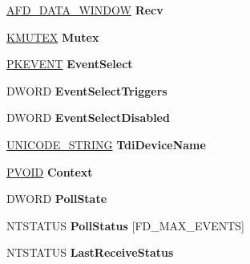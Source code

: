 \begin{DoxyCompactItemize}
\item 
\mbox{\label{struct___a_f_d___f_c_b_ad835dd04de86a1135b0fc7a15b063022}} 
\hyperlink{struct___a_f_d___d_a_t_a___w_i_n_d_o_w}{A\+F\+D\+\_\+\+D\+A\+T\+A\+\_\+\+W\+I\+N\+D\+OW} {\bfseries Recv}
\item 
\mbox{\label{struct___a_f_d___f_c_b_af5a5016765e974260d9beff1cfbc437a}} 
\hyperlink{struct___k_m_u_t_a_n_t}{K\+M\+U\+T\+EX} {\bfseries Mutex}
\item 
\mbox{\label{struct___a_f_d___f_c_b_ae275979ceecf39ce45f8b279416dd208}} 
\hyperlink{struct___k_e_v_e_n_t}{P\+K\+E\+V\+E\+NT} {\bfseries Event\+Select}
\item 
\mbox{\label{struct___a_f_d___f_c_b_abc8585d94e8db43f3c6a02a421456524}} 
D\+W\+O\+RD {\bfseries Event\+Select\+Triggers}
\item 
\mbox{\label{struct___a_f_d___f_c_b_a032dab0d1413ed52a9809342de9b6323}} 
D\+W\+O\+RD {\bfseries Event\+Select\+Disabled}
\item 
\mbox{\label{struct___a_f_d___f_c_b_a7931a3d84299331640ec8f60e9350047}} 
\hyperlink{struct___u_n_i_c_o_d_e___s_t_r_i_n_g}{U\+N\+I\+C\+O\+D\+E\+\_\+\+S\+T\+R\+I\+NG} {\bfseries Tdi\+Device\+Name}
\item 
\mbox{\label{struct___a_f_d___f_c_b_a21e33771275c59954a5536eb2616c1c0}} 
\hyperlink{interfacevoid}{P\+V\+O\+ID} {\bfseries Context}
\item 
\mbox{\label{struct___a_f_d___f_c_b_a9b135680dbadc7dfc71d203fca301006}} 
D\+W\+O\+RD {\bfseries Poll\+State}
\item 
\mbox{\label{struct___a_f_d___f_c_b_a764dd99279223a2c6342f4580f02865f}} 
N\+T\+S\+T\+A\+T\+US {\bfseries Poll\+Status} \mbox{[}F\+D\+\_\+\+M\+A\+X\+\_\+\+E\+V\+E\+N\+TS\mbox{]}
\item 
\mbox{\label{struct___a_f_d___f_c_b_a98a5c39ba7551b507417cbe8b8cee971}} 
N\+T\+S\+T\+A\+T\+US {\bfseries Last\+Receive\+Status}

\end{DoxyCompactItemize}

